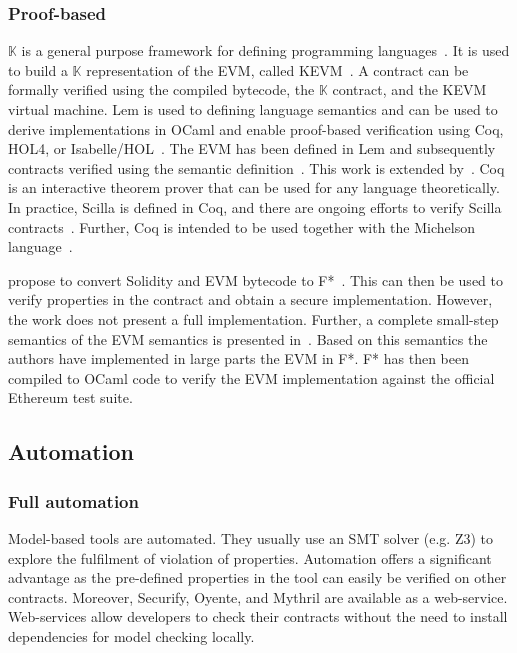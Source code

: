\subsubsection{Proof-based}
$\mathbb{K}$ is a general purpose framework for defining programming languages~\cite{Rosu2007}. It is used to build a $\mathbb{K}$ representation of the EVM, called KEVM~\cite{Hildenbrandt2017}. 
A contract can be formally verified using the compiled bytecode, the $\mathbb{K}$ contract, and the KEVM virtual machine. 
Lem is used to defining language semantics and can be used to derive implementations in OCaml and enable proof-based verification using Coq, HOL4, or Isabelle/HOL~\cite{Mulligan2014}. The EVM has been defined in Lem and subsequently contracts verified using the semantic definition~\cite{Hirai2017}. This work is extended by~\cite{Amani2018}. 
Coq is an interactive theorem prover that can be used for any language theoretically. In practice, Scilla is defined in Coq, and there are ongoing efforts to verify Scilla contracts~\cite{Sergey2018}. Further, Coq is intended to be used together with the Michelson language~\cite{DynamicLedgerSolutions2017}.

\citeauthor{Bhargavan2016} propose to convert Solidity and EVM bytecode to F*~\cite{Bhargavan2016}. This can then be used to verify properties in the contract and obtain a secure implementation. However, the work does not present a full implementation.
Further, a complete small-step semantics of the EVM semantics is presented in~\cite{Grishchenko2018}. Based on this semantics the authors have implemented in large parts the EVM in F*. F* has then been compiled to OCaml code to verify the EVM implementation against the official Ethereum test suite.

\subsection{Automation} 
\subsubsection{Full automation}
Model-based tools are automated. They usually use an SMT solver (e.g. Z3) to explore the fulfilment of violation of properties. Automation offers a significant advantage as the pre-defined properties in the tool can easily be verified on other contracts. Moreover, Securify, Oyente, and Mythril are available as a web-service. Web-services allow developers to check their contracts without the need to install dependencies for model checking locally.

